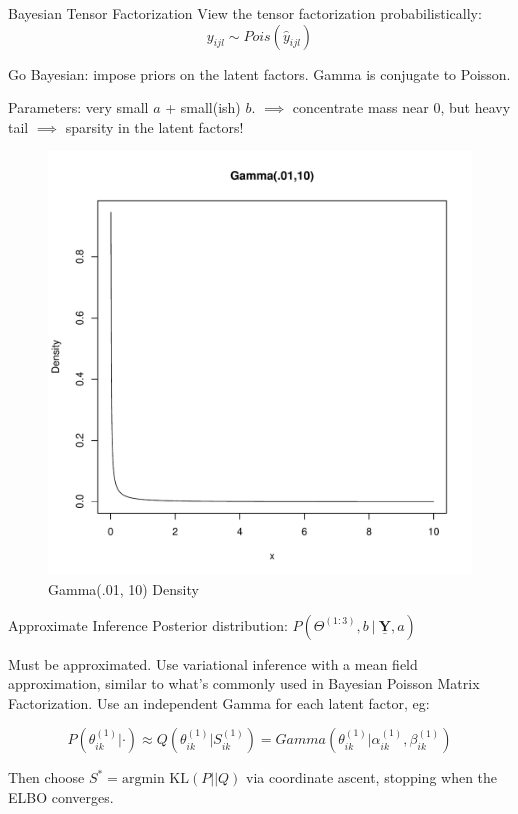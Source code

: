 \documentclass[xcolor=svgnames]{beamer}
\newcommand{\tensor}[1]{
  \ensuremath{\underline{\mathbf{#1}}}}
\begin{document}
\begin{frame}{Bayesian Tensor Factorization}
	View the tensor factorization probabilistically:
	$$y_{ijl} \sim Pois(\hat{y}_{ijl})$$

	Go Bayesian: impose priors on the latent factors. Gamma is conjugate to Poisson.

	Parameters: very small $a$ + small(ish) $b$. $\implies$ concentrate mass near 0, but heavy tail $\implies$ sparsity in the latent factors! 

	\begin{figure}[h]
	\centering
	\includegraphics[width=.5\linewidth]{gamma}
	\caption{Gamma(.01, 10) Density}
	\end{figure}

\end{frame}

\begin{frame}{Approximate Inference}
	Posterior distribution: $P\left(\Theta^{(1:3)}, b \ |\  \tensor{Y}, a\right)$

	Must be approximated. Use variational inference with a mean field approximation, similar to what's commonly used in Bayesian Poisson Matrix Factorization. Use an independent Gamma for each latent factor, eg:

	$$P\left(\theta^{(1)}_{ik}|\cdot\right) \approx Q\left(\theta^{(1)}_{ik} | S^{(1)}_{ik}\right) = Gamma\left(\theta^{(1)}_{ik} | \alpha^{(1)}_{ik}, \beta^{(1)}_{ik}\right)$$

	Then choose $S^* = \textrm{argmin KL}(P || Q)$ via coordinate ascent, stopping when the ELBO converges. 
\end{frame}

\end{document}
